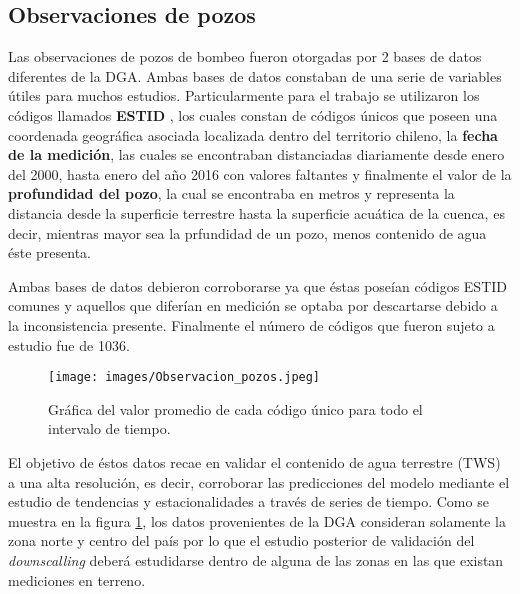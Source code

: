    \subsection{Observaciones de pozos}
    Las observaciones de pozos de bombeo fueron otorgadas por 2 bases de datos diferentes de la DGA. Ambas bases de datos constaban de una serie de variables útiles para muchos estudios.
    Particularmente para el trabajo se utilizaron los códigos llamados \textbf{ESTID} \cite{gwl}, los cuales constan de códigos únicos que poseen una coordenada geográfica asociada localizada dentro
    del territorio chileno, la \textbf{fecha de la medición}, las cuales se encontraban distanciadas diariamente desde enero del 2000, hasta enero del año 2016 con valores faltantes y finalmente el valor de la \textbf{profundidad del pozo},
    la cual se encontraba en metros y representa la distancia desde la superficie terrestre hasta la superficie acuática de la cuenca, es decir, mientras mayor sea la prfundidad de un pozo, menos contenido de agua éste presenta.

    Ambas bases de datos debieron corroborarse ya que éstas poseían códigos ESTID comunes y aquellos que diferían en medición se optaba por descartarse debido a la inconsistencia presente.
    Finalmente el número de códigos que fueron sujeto a estudio fue de 1036. 

    \begin{figure}[H]
        \centering
              \texttt{[image: images/Observacion\_pozos.jpeg]}
        \caption[Datos de Pozos DGA sin procesar]{\footnotesize Gráfica del valor promedio de cada código único para todo el intervalo de tiempo.}
        \label{pozosDGA}
    \end{figure}

    El objetivo de éstos datos recae en validar el contenido de agua terrestre (TWS) a una alta resolución, es decir, corroborar las predicciones del modelo mediante el estudio de tendencias y estacionalidades a través de series de tiempo. 
    Como se muestra en la figura \ref{pozosDGA}, los datos provenientes de la DGA consideran solamente la zona norte y centro del país por lo que el estudio posterior de validación del
    \textit{downscalling} deberá estudidarse dentro de alguna de las zonas en las que existan mediciones en terreno.

